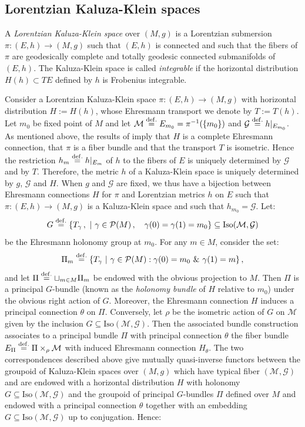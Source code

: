 \documentclass[10pt, cmp, numbook, final, a4paper]{svjour}
\newcommand{\eqdef}{\stackrel{{\rm def.}}{=}}
\newcommand{\be}{\begin{equation*}}
\newcommand{\ee}{\end{equation*}}
\newcommand{\cM}{\mathcal{M}}
\def\cP{\mathcal{P}}
\def\cG{\mathcal{G}}
\def\Iso{\mathrm{Iso}}
\begin{document}
\subsection{Lorentzian Kaluza-Klein spaces}

\begin{definition}
A {\em Lorentzian Kaluza-Klein space} over $(M,g)$ is a Lorentzian
submersion $\pi:(E,h)\rightarrow (M,g)$ such that $(E,h)$ is connected
and such that the fibers of $\pi$ are geodesically complete and
totally geodesic connected submanifolds of $(E,h)$. The Kaluza-Klein
space is called {\em integrable} if the horizontal distribution
$H(h)\subset TE$ defined by $h$ is Frobenius integrable.
\end{definition}

\noindent
Consider a Lorentzian Kaluza-Klein space $\pi:(E,h)\rightarrow (M,g)$ with
horizontal distribution $H:=H(h)$, whose Ehresmann transport we denote
by $T:=T(h)$. Let $m_0$ be fixed point of $M$ and let $\cM\eqdef
E_{m_0}=\pi^{-1}(\{m_0\})$ and $\cG\eqdef h|_{E_{m_0}}$. As mentioned
above, the results of \cite{Reckziegel} imply that $H$ is a complete
Ehresmann connection, that $\pi$ is a fiber bundle and that the
transport $T$ is isometric. Hence the restriction $h_m\eqdef h|_{E_m}$
of $h$ to the fibers of $E$ is uniquely determined by $\cG$ and by
$T$. Therefore, the metric $h$ of a Kaluza-Klein space is uniquely
determined by $g$, $\cG$ and $H$. When $g$ and $\cG$ are fixed, we
thus have a bijection between Ehresmann connections $H$ for $\pi$ and
Lorentzian metrics $h$ on $E$ such that $\pi:(E,h)\rightarrow (M,g)$
is a Kaluza-Klein space and such that $h_{m_0}=\cG$. Let:
\be
G\eqdef \{T_\gamma\, , \,\, |\,\, \gamma\in \cP(M)\, , \quad \gamma(0)=\gamma(1)=m_0\}\subseteq \Iso(\cM,\cG)
\ee
be the Ehresmann holonomy group at $m_0$. For any $m\in M$, consider the set:
\be
\Pi_m \eqdef \{T_\gamma\,\, |\,\, \gamma\in \cP(M): \gamma(0)=m_0\,\, \&\,\,  \gamma(1)=m\}\, ,
\ee
and let $\Pi\eqdef \sqcup_{m\in M}\Pi_m$ be endowed with the obvious
projection to $M$.  Then $\Pi$ is a principal $G$-bundle (known as the
{\em holonomy bundle} of $H$ relative to $m_0$) under the obvious
right action of $G$. Moreover, the Ehresmann connection $H$ induces a
principal connection $\theta$ on $\Pi$. Conversely, let $\rho$ be the
isometric action of $G$ on $\cM$ given by the inclusion $G\subseteq
\Iso(\cM,\cG)$. Then the associated bundle construction associates to
a principal bundle $\Pi$ with principal connection $\theta$ the fiber
bundle $E_\Pi\eqdef \Pi\times_\rho \cM$ with induced Ehresmann
connection $H_\theta$. The two correspondences described above give
mutually quasi-inverse functors between the groupoid of Kaluza-Klein
spaces over $(M,g)$ which have typical fiber $(\cM,\cG)$ and are
endowed with a horizontal distribution $H$ with holonomy $G\subseteq
\Iso(\cM,\cG)$ and the groupoid of principal $G$-bundles $\Pi$ defined
over $M$ and endowed with a principal connection $\theta$ together
with an embedding $G\subseteq \Iso(\cM,\cG)$ up to conjugation. Hence:
\end{document}
